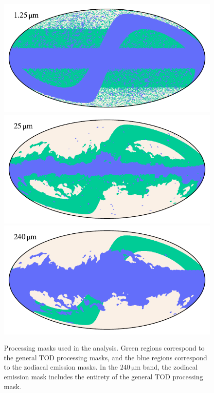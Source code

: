 \documentclass{aa}
\begin{document}
\begin{figure}
  \centering
  \includegraphics[width=\columnwidth]{figs/mask_01.pdf}
  \includegraphics[width=\columnwidth]{figs/mask_06.pdf}
  \includegraphics[width=\columnwidth]{figs/mask_10.pdf}
	\caption{Processing masks used in the analysis. Green regions correspond to the general TOD processing masks, and the blue regions correspond to the zodiacal emission masks. In the $240\,\mathrm{\mu m}$ band, the zodiacal emission mask includes the entirety of the general TOD processing mask.}
  \label{fig:masks}
\end{figure}
\end{document}
